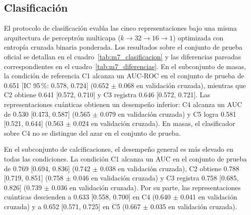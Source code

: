 
\subsection{Clasificación}
\label{sec:rendimiento_clasificacion}

El protocolo de clasificación evalúa las cinco representaciones bajo una misma arquitectura de perceptrón multicapa ($k \to 32 \to 16 \to 1$) optimizada con entropía cruzada binaria ponderada. Los resultados sobre el conjunto de prueba oficial se detallan en el cuadro~\ref{tab:m7_clasificacion} y las diferencias pareadas correspondientes en el cuadro~\ref{tab:m7_diferencias}. En el subconjunto de masas, la condición de referencia C1 alcanza un AUC-ROC en el conjunto de prueba de 0.651 [IC 95\,\%: 0.578, 0.724] (0.652 $\pm$ 0.068 en validación cruzada), mientras que C2 obtiene 0.641 [0.572, 0.710] y C3 registra 0.646 [0.572, 0.721]. Las representaciones cuánticas obtienen un desempeño inferior: C4 alcanza un AUC de 0.530 [0.473, 0.587] (0.565 $\pm$ 0.079 en validación cruzada) y C5 logra 0.581 [0.521, 0.644] (0.563 $\pm$ 0.024 en validación cruzada). En masas, el clasificador sobre C4 no se distingue del azar en el conjunto de prueba.

En el subconjunto de calcificaciones, el desempeño general es más elevado en todas las condiciones. La condición C1 alcanza un AUC en el conjunto de prueba de 0.769 [0.694, 0.836] (0.742 $\pm$ 0.038 en validación cruzada), C2 obtiene 0.788 [0.719, 0.851] (0.758 $\pm$ 0.046 en validación cruzada) y C3 registra 0.758 [0.685, 0.826] (0.739 $\pm$ 0.036 en validación cruzada). Por su parte, las representaciones cuánticas descienden a 0.633 [0.558, 0.700] en C4 (0.640 $\pm$ 0.041 en validación cruzada) y a 0.652 [0.571, 0.725] en C5 (0.667 $\pm$ 0.035 en validación cruzada).


